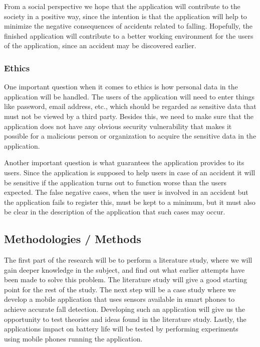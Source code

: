 \documentclass[12pt, a4paper, onecolumn]{article}
\begin{document}
	From a social perspective we hope that the application will contribute to the society in a positive way, since the intention is that the application will help to minimize the negative consequences of accidents related to falling. Hopefully, the finished application will contribute to a better working environment for the users of the application, since an accident may be discovered earlier.  
	
	\subsubsection{Ethics}
	
	One important question when it comes to ethics is how personal data in the application will be handled. The users of the application will need to enter things like password, email address, etc., which should be regarded as sensitive data that must not be viewed by a third party. Besides this, we need to make sure that the application does not have any obvious security vulnerability that makes it possible for a malicious person or organization to acquire the sensitive data in the application.
	
	Another important question is what guarantees the application provides to its users. Since the application is supposed to help users in case of an accident it will be sensitive if the application turns out to function worse than the users expected. The false negative cases, when the user is involved in an accident but the application fails to register this, must be kept to a minimum, but it must also be clear in the description of the application that such cases may occur.
	
	\subsection{Methodologies / Methods}
	
	The first part of the research will be to perform a literature study, where we will gain deeper knowledge in the subject, and find out what earlier attempts have been made to solve this problem. The literature study will give a good starting point for the rest of the study. The next step will be a case study where we develop a mobile application that uses sensors available in smart phones to achieve accurate fall detection. Developing such an application will give us the opportunity to test theories and ideas found in the literature study. Lastly, the applications impact on battery life will be tested by performing experiments using mobile phones running the application.
	
\end{document}
